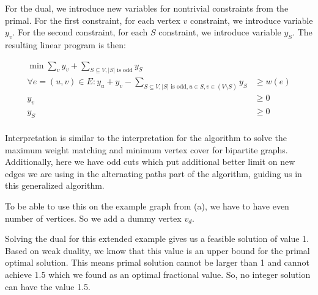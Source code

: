 \documentclass[a4paper,11pt,oneside,onecolumn]{article}
\begin{document}
For the dual, we introduce new variables for nontrivial constraints from the primal. For the first constraint, for each
vertex $v$ constraint, we introduce variable $y_v$. For the second constraint, for each $S$ constraint, we introduce variable
$y_S$. The resulting linear program is then:

\begin{align*}
\min \sum_v y_v + \sum_{S \subseteq V, |S| \textrm{ is odd}} y_S & \\
\forall e = (u,v) \in E: y_u + y_v - \sum_{S \subseteq V, |S| \textrm{ is odd}, u \in S, v \in (V \setminus S)} y_S & \ge w(e) \\
y_v & \ge 0 \\
y_S & \ge 0 \\
\end{align*}

Interpretation is similar to the interpretation for the algorithm to solve the maximum weight matching and minimum vertex cover
for bipartite graphs. Additionally, here we have odd cuts which put additional better limit on new edges we are using in the
alternating paths part of the algorithm, guiding us in this generalized algorithm.

To be able to use this on the example graph from (a), we have to have even number of vertices. So we add a dummy vertex $v_d$.

\begin{center}
\end{center}

Solving the dual for this extended example gives us a feasible solution of value 1. Based on weak duality, we know that this
value is an upper bound for the primal optimal solution. This means primal solution cannot be larger than 1 and cannot
achieve 1.5 which we found as an optimal fractional value. So, no integer solution can have the value 1.5.

\section{}
\end{document}
